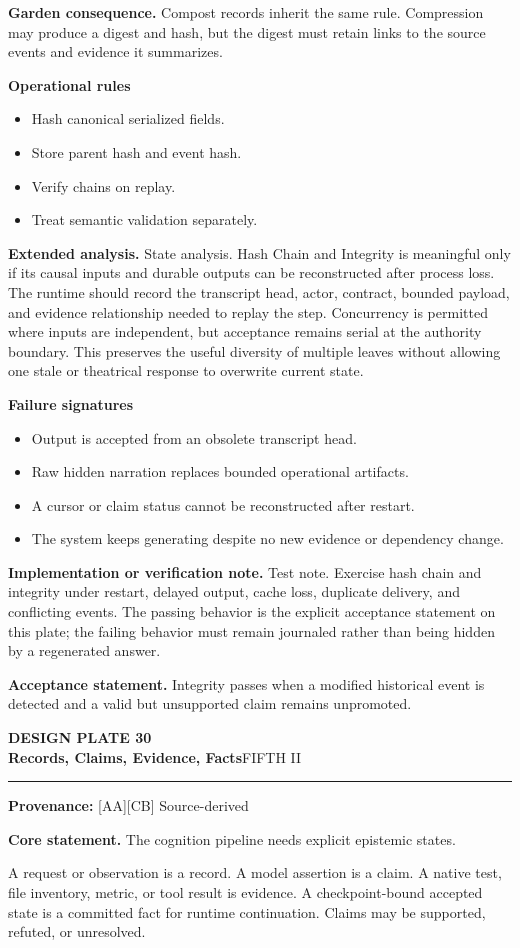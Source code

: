\documentclass[10pt,letterpaper,oneside]{article}
\newcommand{\prov}[1]{\textcolor{gardenBlue}{\sffamily\footnotesize\textbf{Provenance:} #1}}
\newcommand{\platetitle}[3]{%
  \begin{minipage}[t][0.54in][t]{\textwidth}
  {\sffamily\bfseries\color{gardenDeep}\fontsize{9}{10}\selectfont DESIGN PLATE #1}\\[-1pt]
  {\sffamily\bfseries\color{gardenInk}\fontsize{16.5}{18}\selectfont #2}\hfill{\sffamily\color{gardenGreen}\large #3}
  \end{minipage}\vspace{-2pt}\hrule\vspace{5pt}}
\begin{document}
\textbf{Garden consequence.} Compost records inherit the same rule. Compression may produce a digest and hash, but the digest must retain links to the source events and evidence it summarizes.

\textbf{Operational rules}
\begin{itemize}
\item Hash canonical serialized fields.
\item Store parent hash and event hash.
\item Verify chains on replay.
\item Treat semantic validation separately.
\end{itemize}
\textbf{Extended analysis.} State analysis. Hash Chain and Integrity is meaningful only if its causal inputs and durable outputs can be reconstructed after process loss. The runtime should record the transcript head, actor, contract, bounded payload, and evidence relationship needed to replay the step. Concurrency is permitted where inputs are independent, but acceptance remains serial at the authority boundary. This preserves the useful diversity of multiple leaves without allowing one stale or theatrical response to overwrite current state.

\textbf{Failure signatures}
\begin{itemize}
\item Output is accepted from an obsolete transcript head.
\item Raw hidden narration replaces bounded operational artifacts.
\item A cursor or claim status cannot be reconstructed after restart.
\item The system keeps generating despite no new evidence or dependency change.
\end{itemize}
\textbf{Implementation or verification note.} Test note. Exercise hash chain and integrity under restart, delayed output, cache loss, duplicate delivery, and conflicting events. The passing behavior is the explicit acceptance statement on this plate; the failing behavior must remain journaled rather than being hidden by a regenerated answer.

\begin{acceptbox}
\textbf{Acceptance statement.} Integrity passes when a modified historical event is detected and a valid but unsupported claim remains unpromoted.
\end{acceptbox}
\newpage
\platetitle{30}{Records, Claims, Evidence, Facts}{FIFTH II}
\prov{[AA][CB] Source-derived}
\fontsize{8.85}{10.45}\selectfont
\begin{corebox}
\textbf{Core statement.} The cognition pipeline needs explicit epistemic states.
\end{corebox}
A request or observation is a record. A model assertion is a claim. A native test, file inventory, metric, or tool result is evidence. A checkpoint-bound accepted state is a committed fact for runtime continuation. Claims may be supported, refuted, or unresolved.
\end{document}
